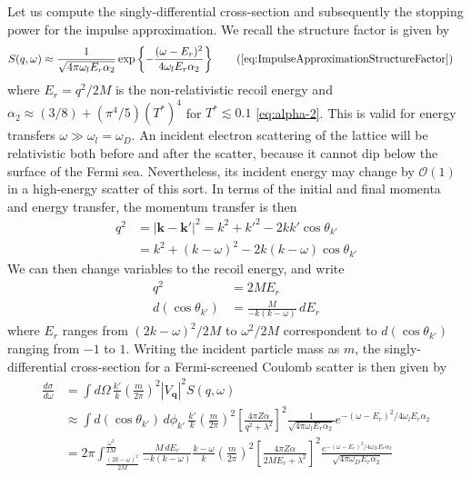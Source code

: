 \documentclass{article}
\newcommand{\OO}{\mathcal{O}}
\begin{document}
Let us compute the singly-differential cross-section and subsequently the stopping power for the impulse approximation. We recall the structure factor is given by
\begin{align}
S(q, \omega) &\approx \frac{1}{\sqrt{4 \pi \omega_l E_r \alpha_2}} \exp\left\{ -\frac{(\omega - E_r)^2}{4 \omega_lE_r \alpha_2} \right\} \tag{\ref{eq:ImpulseApproximationStructureFactor}}
\end{align}
where $E_r = q^2 / 2 M$ is the non-relativistic recoil energy and $\alpha_2 \approx (3/8) + (\pi^4/5)(T^*)^4$ for $T^*\lesssim 0.1$ \eqref{eq:alpha-2}. This is valid for energy transfers $\omega \gg \omega_l = \omega_D$. An incident electron scattering of the lattice will be relativistic both before and after the scatter, because it cannot dip below the surface of the Fermi sea. Nevertheless, its incident energy may change by $\OO(1)$ in a high-energy scatter of this sort. In terms of the initial and final momenta and energy transfer, the momentum transfer is then
\begin{align}
q^2 &= |\textbf{k} - \textbf{k}'|^2 = k^2 + k'^2 - 2 kk'\cos\theta_{k'} \nonumber\\
  &= k^2 + (k - \omega)^2 - 2 k(k - \omega)\cos\theta_{k'} \label{eq:RelativisticMomentumTransfer}
\end{align}
We can then change variables to the recoil energy, and write
\begin{align}
q^2 &= 2 ME_r \\
d(\cos\theta_{k'}) &= \frac{M}{-k(k - \omega)}\,dE_r
\end{align}
where $E_r$ ranges from $(2 k - \omega)^2 / 2 M$ to $\omega^2 / 2 M$ correspondent to $d(\cos\theta_{k'})$ ranging from $-1$ to $1$.
Writing the incident particle mass as $m$, the singly-differential cross-section for a Fermi-screened Coulomb scatter is then given by
\begin{align}
  \frac{d \sigma}{d \omega} &= \int d \Omega\, \frac{k'}{k} \left( \frac{m}{2 \pi} \right)^2 |V_\textbf{q}|^2 S(q, \omega)  \nonumber\\
     &\approx \int d(\cos\theta_{k'})\, d \phi_{k'}\, \frac{k'}{k} \left( \frac{m}{2 \pi} \right)^2 \left[ \frac{4 \pi Z\alpha}{q^2+ \lambda^2} \right]^2 \frac{1}{\sqrt{4 \pi \omega_l E_r \alpha_2}} e^{-(\omega - E_r)^2/4 \omega_lE_r \alpha_2} \nonumber\\
     &= 2 \pi \int_{\frac{(2 k - \omega)^2}{2 M}}^{\frac{\omega^2}{2 M}} \frac{M\, dE_r}{-k(k - \omega)} \frac{k - \omega}{k} \left( \frac{m}{2 \pi} \right)^2 \left[ \frac{4 \pi Z\alpha}{2 M E_r + \lambda^2} \right]^2 \frac{e^{-(\omega - E_r)^2/4 \omega_DE_r \alpha_2}}{\sqrt{4 \pi \omega_D E_r \alpha_2}}  \nonumber\\
\end{align}
\end{document}
